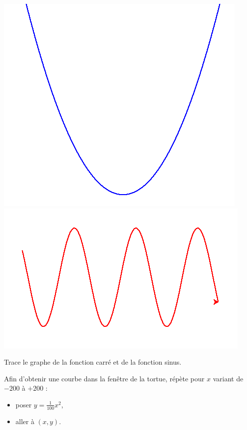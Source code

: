 \documentclass[11pt,class=report,crop=false]{standalone}
\begin{document}

\begin{activite}


\begin{center}
\includegraphics[scale=0.4]{ecran-tortue-3a}
\includegraphics[scale=0.4]{ecran-tortue-3b}
\end{center}

Trace le graphe de la fonction carré et de la fonction sinus.

Afin d'obtenir une courbe dans la fenêtre de la tortue, répète pour $x$ variant de $-200$ à $+200$ :
\begin{itemize}
  \item poser $y = \frac{1}{100} x^2$,
  \item aller à $(x,y)$.
\end{itemize}


\end{activite}
\end{document}
